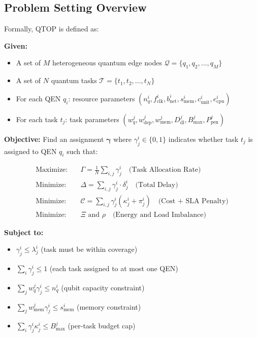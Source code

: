 \documentclass[12pt,a4paper]{article}
\begin{document}
\subsection{Problem Setting Overview}

Formally, QTOP is defined as:

\textbf{Given:}
\begin{itemize}
  \item A set of $M$ heterogeneous quantum edge nodes $\mathcal{Q}=\{q_1, q_2, \ldots, q_M\}$
  \item A set of $N$ quantum tasks $\mathcal{T}=\{t_1, t_2, \ldots, t_N\}$
  \item For each QEN $q_i$: resource parameters $(n^i_q, f^i_{\text{clk}}, b^i_{\text{net}}, s^i_{\text{mem}}, c^i_{\text{unit}}, e^i_{\text{cpu}})$
  \item For each task $t_j$: task parameters $(w^j_q, w^j_{\text{dep}}, w^j_{\text{mem}}, D^j_{\text{dl}}, B^j_{\text{max}}, P^j_{\text{pen}})$
\end{itemize}

\textbf{Objective:} Find an assignment $\boldsymbol{\gamma}$ where $\gamma^i_j \in \{0,1\}$ indicates whether task $t_j$ is assigned to QEN $q_i$ such that:

\begin{equation}
\begin{aligned}
\text{Maximize:} \quad & \Gamma = \frac{1}{N}\sum_{i,j}\gamma^i_j \quad \text{(Task Allocation Rate)} \\
\text{Minimize:} \quad & \Delta = \sum_{i,j}\gamma^i_j \cdot \delta^i_j \quad \text{(Total Delay)} \\
\text{Minimize:} \quad & \mathcal{C} = \sum_{i,j}\gamma^i_j(\kappa^i_j + \pi^i_j) \quad \text{(Cost + SLA Penalty)} \\
\text{Minimize:} \quad & \Xi \text{ and } \rho \quad \text{(Energy and Load Imbalance)}
\end{aligned}
\end{equation}

\textbf{Subject to:}
\begin{itemize}
  \item $\gamma^i_j \leq \lambda^i_j$ (task must be within coverage)
  \item $\sum_i \gamma^i_j \leq 1$ (each task assigned to at most one QEN)
  \item $\sum_j w^j_q \gamma^i_j \leq n^i_q$ (qubit capacity constraint)
  \item $\sum_j w^j_{\text{mem}} \gamma^i_j \leq s^i_{\text{mem}}$ (memory constraint)
  \item $\sum_i \gamma^i_j \kappa^i_j \leq B^j_{\text{max}}$ (per-task budget cap)
\end{itemize}
\end{document}
